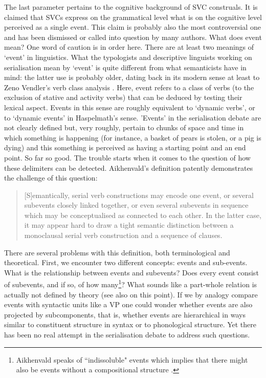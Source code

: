 The last parameter pertains to the cognitive background of SVC construals. It is claimed that SVCs express on the grammatical level what is on the cognitive level perceived as a single event. This claim is probably also the most controversial one and has been dismissed or called into question by many authors. What does event mean? One word of caution is in order here. There are at least two meanings of `event' in linguistics. What the typologists and descriptive linguists working on serialisation mean by `event' is quite different from what semanticists have in mind: the latter use is probably older, dating back in its modern sense at least to Zeno Vendler's verb class analysis \parencite{vendler1957verbs}. Here, event refers to a class of verbs (to the exclusion of stative and activity verbs) that can be deduced by testing their lexical aspect. Events in this sense are roughly equivalent to `dynamic verbs', or to `dynamic events' in Haspelmath's \citep{haspelmath2016serial} sense. 'Events' in the serialisation debate are not clearly defined but, very roughly, pertain to chunks of space and time in which something is happening (for instance, a basket of pears is stolen, or a pig is dying) and this something is perceived as having a starting point and an end point. So far so good. The trouble starts when it comes to the question of how these delimiters can be detected. Aikhenvald's definition patently demonstrates the challenge of this question:

\begin{quote}[S]emantically, serial verb constructions may encode one event, or several subevents closely linked together, or even several subevents in sequence which may be conceptualised as connected to each other. In the latter case, it may appear hard to draw a tight semantic distinction between a monoclausal serial verb construction and a sequence of clauses. \citep[12]{Aikhenvald2006}\end{quote} 

There are several problems with this definition, both terminological and theoretical. First, we encounter two different concepts: events and sub-events. What is the relationship between events and subevents? Does every event consist of subevents, and if so, of how many\footnote{Aikhenvald speaks of ``indissoluble" events which implies that there might also be events without a compositional structure \citep[12]{Aikhenvald2006}.}? What sounds like a part-whole relation is actually not defined by theory (see also \citealt[499]{bohnemeyer2007principles} on this point). If we by analogy compare events with syntactic units like a VP one could wonder whether events are also projected by subcomponents, that is, whether events are hierarchical in ways similar to constituent structure in syntax or to phonological structure. Yet there has been no real attempt in the serialisation debate to address such questions. 

